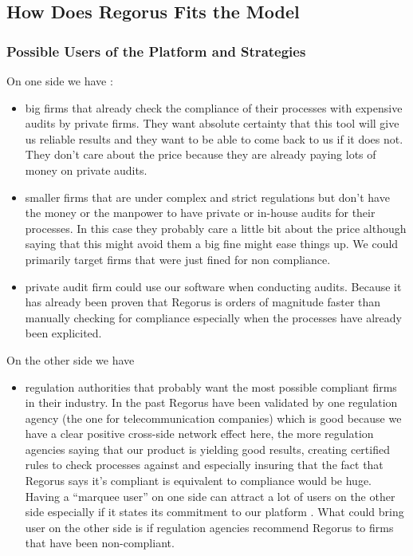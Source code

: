 \documentclass[10pt]{report}
\begin{document}
\subsection{How Does Regorus Fits the Model}

\subsubsection{Possible Users of the Platform and Strategies}
On one side we have :
\begin{itemize}
\item big firms that already check the compliance of their processes with expensive audits by private firms. They want absolute certainty that this tool will give us reliable results and they want to be able to come back to us if it does not. They don't care about the price because they are already paying lots of money on private audits.
\item smaller firms that are under complex and strict regulations but don't have the money or the manpower to have private or in-house audits for their processes. In this case they probably care a little bit about the price although saying that this might avoid them a big fine might ease things up. We could primarily target firms that were just fined for non compliance.
\item private audit firm could use our software when conducting audits. Because it has already been proven that Regorus is orders of magnitude faster than manually checking for compliance especially when the processes have already been explicited.
\end{itemize}

On the other side we have
\begin{itemize}
\item regulation authorities that probably want the most possible compliant firms in their industry. In the past Regorus have been validated by one regulation agency (the one for telecommunication companies) which is good because we have a clear positive cross-side network effect here, the more regulation agencies saying that our product is yielding good results, creating certified rules to check processes against and especially insuring that the fact that Regorus says it's compliant is equivalent to compliance would be huge. Having a \enquote{marquee user} on one side can attract a lot of users on the other side especially if it states its commitment to our platform \autocite{eisenmann2006strategies}. What could bring user on the other side is if regulation agencies recommend Regorus to firms that have been non-compliant. 
\end{itemize}
\end{document}
